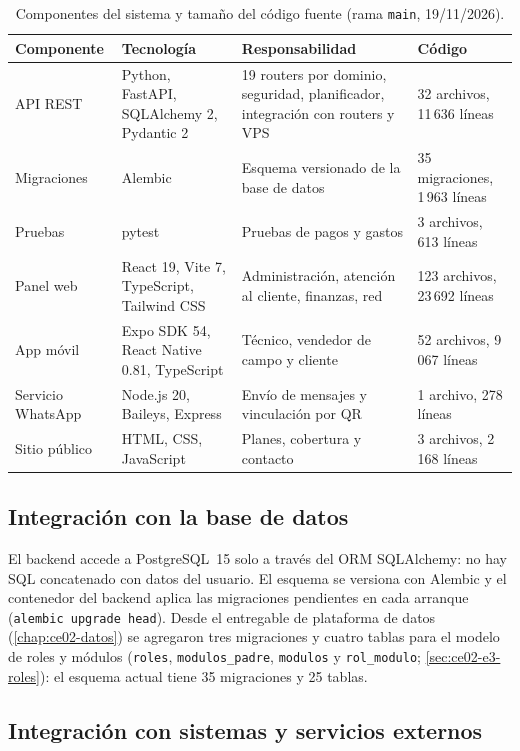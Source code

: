 \begin{table}[H]
\centering
\caption{Componentes del sistema y tamaño del código fuente (rama \texttt{main}, 19/11/2026).}
\label{tab:ce02-e3-componentes}
\small
\begin{tabularx}{\textwidth}{L{3cm}L{4cm}XL{2.6cm}}
\toprule
\textbf{Componente} & \textbf{Tecnología} & \textbf{Responsabilidad} & \textbf{Código} \\
\midrule
API REST & Python, FastAPI, SQLAlchemy 2, Pydantic 2 & 19 routers por dominio, seguridad, planificador, integración con routers y VPS & 32 archivos, 11\,636 líneas \\
Migraciones & Alembic & Esquema versionado de la base de datos & 35 migraciones, 1\,963 líneas \\
Pruebas & pytest & Pruebas de pagos y gastos & 3 archivos, 613 líneas \\
Panel web & React 19, Vite 7, TypeScript, Tailwind CSS & Administración, atención al cliente, finanzas, red & 123 archivos, 23\,692 líneas \\
App móvil & Expo SDK 54, React Native 0.81, TypeScript & Técnico, vendedor de campo y cliente & 52 archivos, 9\,067 líneas \\
Servicio WhatsApp & Node.js 20, Baileys, Express & Envío de mensajes y vinculación por QR & 1 archivo, 278 líneas \\
Sitio público & HTML, CSS, JavaScript & Planes, cobertura y contacto & 3 archivos, 2\,168 líneas \\
\bottomrule
\end{tabularx}
\end{table}

\subsection{Integración con la base de datos}

El backend accede a PostgreSQL~15 solo a través del ORM SQLAlchemy: no hay SQL concatenado
con datos del usuario. El esquema se versiona con Alembic y el contenedor del backend aplica
las migraciones pendientes en cada arranque (\texttt{alembic upgrade head}). Desde el
entregable de plataforma de datos (\cref{chap:ce02-datos}) se agregaron tres migraciones y
cuatro tablas para el modelo de roles y módulos (\texttt{roles}, \texttt{modulos\_padre},
\texttt{modulos} y \texttt{rol\_modulo}; \cref{sec:ce02-e3-roles}): el esquema actual tiene
35 migraciones y 25 tablas.

\subsection{Integración con sistemas y servicios externos}

